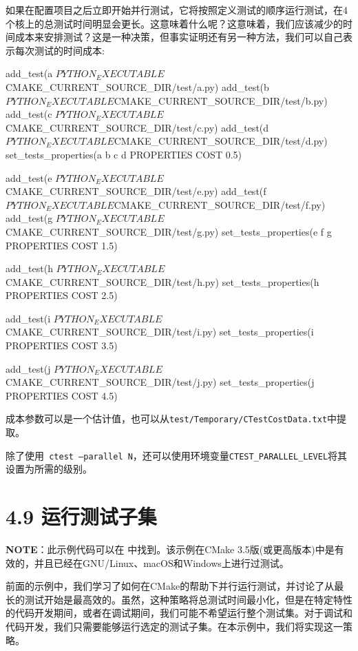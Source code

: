 如果在配置项目之后立即开始并行测试，它将按照定义测试的顺序运行测试，在4个核上的总测试时间明显会更长。这意味着什么呢？这意味着，我们应该减少的时间成本来安排测试？这是一种决策，但事实证明还有另一种方法，我们可以自己表示每次测试的时间成本:

\begin{codebox}[cmake]
add_test(a ${PYTHON_EXECUTABLE} ${CMAKE_CURRENT_SOURCE_DIR}/test/a.py)
add_test(b ${PYTHON_EXECUTABLE} ${CMAKE_CURRENT_SOURCE_DIR}/test/b.py)
add_test(c ${PYTHON_EXECUTABLE} ${CMAKE_CURRENT_SOURCE_DIR}/test/c.py)
add_test(d ${PYTHON_EXECUTABLE} ${CMAKE_CURRENT_SOURCE_DIR}/test/d.py)
set_tests_properties(a b c d PROPERTIES COST 0.5)

add_test(e ${PYTHON_EXECUTABLE} ${CMAKE_CURRENT_SOURCE_DIR}/test/e.py)
add_test(f ${PYTHON_EXECUTABLE} ${CMAKE_CURRENT_SOURCE_DIR}/test/f.py)
add_test(g ${PYTHON_EXECUTABLE} ${CMAKE_CURRENT_SOURCE_DIR}/test/g.py)
set_tests_properties(e f g PROPERTIES COST 1.5)

add_test(h ${PYTHON_EXECUTABLE} ${CMAKE_CURRENT_SOURCE_DIR}/test/h.py)
set_tests_properties(h PROPERTIES COST 2.5)

add_test(i ${PYTHON_EXECUTABLE} ${CMAKE_CURRENT_SOURCE_DIR}/test/i.py)
set_tests_properties(i PROPERTIES COST 3.5)

add_test(j ${PYTHON_EXECUTABLE} ${CMAKE_CURRENT_SOURCE_DIR}/test/j.py)
set_tests_properties(j PROPERTIES COST 4.5)
\end{codebox}

成本参数可以是一个估计值，也可以从\texttt{test/Temporary/CTestCostData.txt}中提取。


除了使用\texttt{ ctest --parallel N}，还可以使用环境变量\texttt{CTEST\_PARALLEL\_LEVEL}将其设置为所需的级别。


\section{4.9 运行测试子集}

\begin{myInfoBox}
\textbf{NOTE}：此示例代码可以在  中找到。该示例在CMake 3.5版(或更高版本)中是有效的，并且已经在GNU/Linux、macOS和Windows上进行过测试。
\end{myInfoBox}

前面的示例中，我们学习了如何在CMake的帮助下并行运行测试，并讨论了从最长的测试开始是最高效的。虽然，这种策略将总测试时间最小化，但是在特定特性的代码开发期间，或者在调试期间，我们可能不希望运行整个测试集。对于调试和代码开发，我们只需要能够运行选定的测试子集。在本示例中，我们将实现这一策略。

